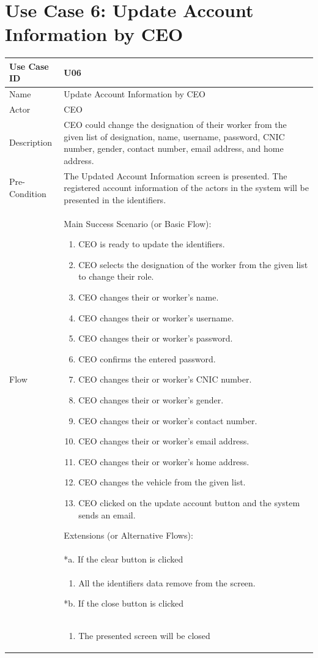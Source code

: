 \documentclass[12pt,a4paper]{report}
\begin{document}
\section{Use Case 6: Update Account Information by CEO}
\begin{tabular}{ | m{3cm} | m{12cm}| } \hline
Use Case ID & U06   \\\hline
Name  &  Update Account Information by CEO \\ \hline
Actor &   CEO\\ \hline
Description & CEO could change the designation of their worker from the given list of designation, name, username, password, CNIC number, gender, contact number, email address, and home address.\\ \hline
Pre-Condition & The Updated Account Information screen is presented. The registered account information of the actors in the system will be presented in the identifiers.  \\\hline
Flow & Main Success Scenario (or Basic Flow):
\begin{enumerate}
\item CEO is ready to update the identifiers.   
\item CEO selects the designation of the worker from the given list to change their role. 
\item  CEO changes their or worker's name.
\item  CEO changes their or worker's username.
\item  CEO changes their or worker's password.
\item  CEO confirms the entered password.
\item  CEO changes their or worker's CNIC number.
\item CEO changes their or worker's gender. 
\item CEO changes their or worker's contact number. 
\item CEO changes their or worker's email address.
\item CEO changes their or worker's home address. 
\item CEO changes the vehicle from the given list.
\item CEO clicked on the update account button and the system sends an email.
\end{enumerate}
Extensions (or Alternative Flows):\\
& *a. If the clear button is clicked \\
& \begin{enumerate}
		\item All the identifiers data remove from the screen.
	\end{enumerate}
*b. If the close button is clicked\\
&	\begin{enumerate}
		\item The presented screen will be closed
	\end{enumerate}
\\\hline
\end{tabular}
\end{document}
